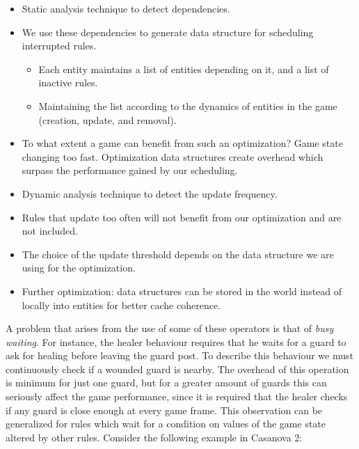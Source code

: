 \begin{itemize}
\item Static analysis technique to detect dependencies.
\item We use these dependencies to generate data structure for scheduling interrupted rules.
	\begin{itemize}
	\item Each entity maintains a list of entities depending on it, and a list of inactive rules.
	\item Maintaining the list according to the dynamics of entities in the game (creation, update, and removal).
	\end{itemize}
\item To what extent a game can benefit from such an optimization? Game state changing too fast. Optimization data structures create overhead which surpass the performance gained by our scheduling.
\item Dynamic analysis technique to detect the update frequency.
\item Rules that update too often will not benefit from our optimization and are not included.
\item The choice of the update threshold depends on the data structure we are using for the optimization.
\item Further optimization: data structures can be stored in the world instead of locally into entities for better cache coherence.
\end{itemize}

A problem that arises from the use of some of these operators is that of \textit{busy waiting}. For instance, the healer behaviour requires that he waits for a guard to ask for healing before leaving the guard post. To describe this behaviour we must continuously check if a wounded guard is nearby. The overhead of this operation is minimum for just one guard, but for a greater amount of guards this can seriously affect the game performance, since it is required that the healer checks if any guard is close enough at every game frame. This observation can be generalized for rules which wait for a condition on values of the game state altered by other rules. Consider the following example in Casanova 2:


